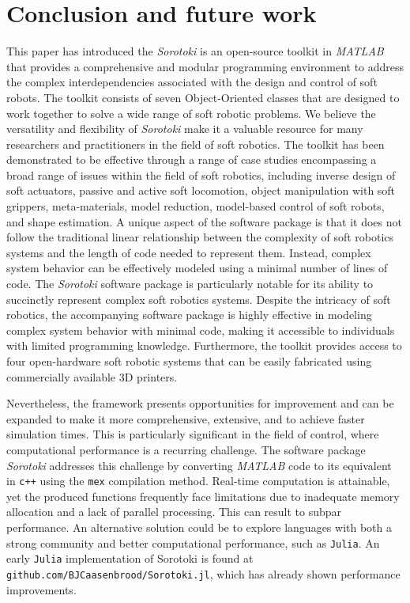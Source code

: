 
\section{Conclusion and future work}
\label{sec:C5:conclusion}
This paper has introduced the \textit{Sorotoki} is an open-source toolkit in \textit{MATLAB} that provides a comprehensive and modular programming environment to address the complex interdependencies associated with the design and control of soft robots. The toolkit consists of seven Object-Oriented classes that are designed to work together to solve a wide range of soft robotic problems. We believe the versatility and flexibility of \textit{Sorotoki} make it a valuable resource for many researchers and practitioners in the field of soft robotics. The toolkit has been demonstrated to be effective through a range of case studies encompassing a broad range of issues within the field of soft robotics, including inverse design of soft actuators, passive and active soft locomotion, object manipulation with soft grippers, meta-materials, model reduction, model-based control of soft robots, and shape estimation. A unique aspect of the software package is that it does not follow the traditional linear relationship between the complexity of soft robotics systems and the length of code needed to represent them. Instead, complex system behavior can be effectively modeled using a minimal number of lines of code. The \textit{Sorotoki} software package is particularly notable for its ability to succinctly represent complex soft robotics systems. Despite the intricacy of soft robotics, the accompanying software package is highly effective in modeling complex system behavior with minimal code, making it accessible to individuals with limited programming knowledge. Furthermore, the toolkit provides access to four open-hardware soft robotic systems that can be easily fabricated using commercially available 3D printers.

Nevertheless, the framework presents opportunities for improvement and can be expanded to make it more comprehensive, extensive, and to achieve faster simulation times. This is particularly significant in the field of control, where computational performance is a recurring challenge. The software package \textit{Sorotoki} addresses this challenge by converting \textit{MATLAB} code to its equivalent in \texttt{c++} using the \texttt{mex} compilation method. Real-time computation is attainable, yet the produced  functions frequently face limitations due to inadequate memory allocation and a lack of parallel processing. This can result to subpar performance. An alternative solution could be to explore languages with both a strong community and better computational performance, such as \texttt{Julia}. An early \texttt{Julia} implementation of Sorotoki is found at \texttt{github.com/BJCaasenbrood/Sorotoki.jl}, which has already shown performance improvements.

